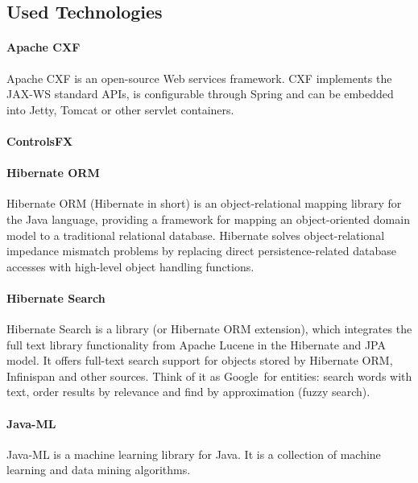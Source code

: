 
\subsection{Used Technologies}

\paragraph{Apache CXF}
Apache CXF is an open-source Web services framework. CXF implements the JAX-WS 
standard APIs, is configurable through Spring and can be embedded into Jetty,
Tomcat or other servlet containers.

\paragraph{ControlsFX}

\paragraph{Hibernate ORM}
Hibernate ORM (Hibernate in short) is an object-relational mapping library for
the Java language, providing a framework for mapping an object-oriented domain
model to a traditional relational database. Hibernate solves object-relational
impedance mismatch problems by replacing direct persistence-related database
accesses with high-level object handling functions.

\paragraph{Hibernate Search}
Hibernate Search is a library (or Hibernate ORM extension), which integrates
the full text library functionality from Apache Lucene in the Hibernate and
JPA model. It offers full-text search support for objects stored by Hibernate
ORM, Infinispan and other sources. Think of it as Google\texttrademark\ for
entities: search words with text, order results by relevance and find by
approximation (fuzzy search).

\paragraph{Java-ML}
Java-ML is a machine learning library for Java. It is a collection of machine
learning and data mining algorithms.


